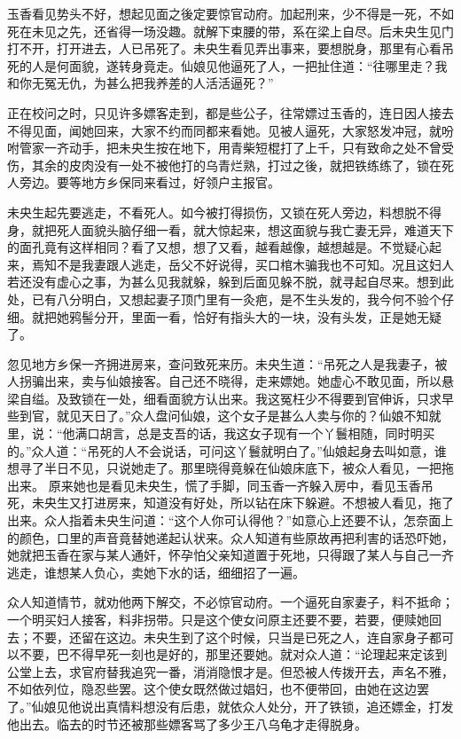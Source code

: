 \documentclass[a4paper,12pt,UTF8,twoside]{ctexbook}
\begin{document}
玉香看见势头不好，想起见面之後定要惊官动府。加起刑来，少不得是一死，不如死在未见之先，还省得一场没趣。就解下束腰的带，系在梁上自尽。后未央生见门打不开，打开进去，人已吊死了。未央生看见弄出事来，要想脱身，那里有心看吊死的人是何面貌，遂转身竟走。仙娘见他逼死了人，一把扯住道：“往哪里走？我和你无冤无仇，为甚么把我养差的人活活逼死？”

正在校问之时，只见许多嫖客走到，都是些公子，往常嫖过玉香的，连日因人接去不得见面，闻她回来，大家不约而同都来看她。见被人逼死，大家怒发冲冠，就吩咐管家一齐动手，把未央生按在地下，用青柴短棍打了上千，只有致命之处不曾受伤，其余的皮肉没有一处不被他打的乌青烂熟，打过之後，就把铁练练了，锁在死人旁边。要等地方乡保同来看过，好领户主报官。

未央生起先要逃走，不看死人。如今被打得损伤，又锁在死人旁边，料想脱不得身，就把死人面貌头脑仔细一看，就大惊起来，想这面貌与我亡妻无异，难道天下的面孔竟有这样相同？看了又想，想了又看，越看越像，越想越是。不觉疑心起来，焉知不是我妻跟人逃走，岳父不好说得，买口棺木骗我也不可知。况且这妇人若还没有虚心之事，为甚么见我就躲，躲到后面见躲不脱，就寻起自尽来。想到此处，已有八分明白，又想起妻子顶门里有一灸疤，是不生头发的，我今何不验个仔细。就把她鸦髻分开，里面一看，恰好有指头大的一块，没有头发，正是她无疑了。

忽见地方乡保一齐拥进房来，查问致死来历。未央生道：“吊死之人是我妻子，被人拐骗出来，卖与仙娘接客。自己还不晓得，走来嫖她。她虚心不敢见面，所以悬梁自缢。及致锁在一处，细看面貌方认出来。我这冤枉少不得要到官伸诉，只求早些到官，就见天日了。”众人盘问仙娘，这个女子是甚么人卖与你的？仙娘不知就里，说：“他满口胡言，总是支吾的话，我这女子现有一个丫鬟相随，同时明买的。”众人道：“吊死的人不会说话，可问这丫鬟就明白了。”仙娘起身去叫如意，谁想寻了半日不见，只说她走了。那里晓得竟躲在仙娘床底下，被众人看见，一把拖出来。 原来她也是看见未央生，慌了手脚，同玉香一齐躲入房中，看见玉香吊死，未央生又打进房来，知道没有好处，所以钻在床下躲避。不想被人看见，拖了出来。众人指着未央生问道：“这个人你可认得他？”如意心上还要不认，怎奈面上的颜色，口里的声音竟替她递起认状来。众人知道有些原故再把利害的话恐吓她，她就把玉香在家与某人通奸，怀孕怕父亲知道置于死地，只得跟了某人与自己一齐逃走，谁想某人负心，卖她下水的话，细细招了一遍。

众人知道情节，就劝他两下解交，不必惊官动府。一个逼死自家妻子，料不抵命；一个明买妇人接客，料非拐带。只是这个使女问原主还要不要，若要，便赎她回去；不要，还留在这边。未央生到了这个时候，只当是已死之人，连自家身子都可以不要，巴不得早死一刻也是好的，那里还要她。就对众人道：“论理起来定该到公堂上去，求官府替我追究一番，消消隐恨才是。但恐被人传拨开去，声名不雅，不如依列位，隐忍些罢。这个使女既然做过娼妇，也不便带回，由她在这边罢了。”仙娘见他说出真情料想没有后患，就依众人处分，开了铁锁，追还嫖金，打发他出去。临去的时节还被那些嫖客骂了多少王八乌龟才走得脱身。
\end{document}
